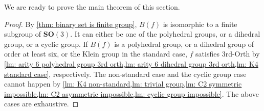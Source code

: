 We are ready to prove the main theorem of this section.
\ThirdOrderOrth*

\begin{proof}
    By \cref{thm: binary set is finite group}, $B(f)$ is isomorphic to a finite subgroup of $\mathbf{SO}(3)$.
    It can either be one of the polyhedral groups, or a dihedral group, or a cyclic group.
    If $B(f)$ is a polyhedral group, or a dihedral group of order at least six, or the Klein group in the standard case, $f$ satisfies {\sc 3rd-Orth} by \cref{lm: arity 6 polyhedral group 3rd orth,lm: arity 6 dihedral group 3rd orth,lm: K4 standard case}, respectively.
    The non-standard case and the cyclic group case cannot happen by \cref{lm: K4 non-standard,lm: trivial group,lm: C2 symmetric impossible,lm: C2 asymmetric impossible,lm: cyclic group impossible}.
    The above cases are exhaustive.
\end{proof}
